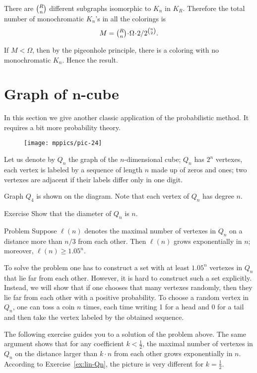 There are $\tbinom Rn$ different subgraphs isomorphic to $K_n$ in $K_R$.
Therefore the total number of monochromatic $K_n$'s in all the colorings 
is 
\[M=\tbinom Rn\cdot\Omega\cdot  2/2^{\binom n2}.\]

If $M<\Omega$, then by the pigeonhole principle,
there is a coloring with no monochromatic $K_n$.
Hence the result.
\qeds

\section*{Graph of $\bm{n}$-cube}

In this section we give another classic application of the probabilistic method.
It requires a bit more probability theory. 

\begin{wrapfigure}{o}{25mm}
\vskip-0mm
\centering
\texttt{[image: mppics/pic-24]}
\vskip-0mm
\end{wrapfigure}

Let us denote by $Q_n$ the graph of the $n$-dimensional cube;
$Q_n$ has $2^n$ vertexes, each vertex is labeled by a sequence of length $n$ made up of zeros and ones;
two vertexes are adjacent if their labels differ only in one digit.

Graph $Q_4$ is shown on the diagram.
Note that each vertex of $Q_n$ has degree $n$.


\begin{thm}{Exercise}
Show that the diameter of $Q_n$ is $n$. 
\end{thm}


\begin{thm}{Problem}\label{prob:Qn}
Suppose $\ell(n)$ denotes the maximal number of vertexes in $Q_n$ on a distance more than $n/3$ from each other.
Then $\ell(n)$ grows exponentially in $n$;
moreover, $\ell(n)\ge 1.05^n$. 
\end{thm}

To solve the problem one has to construct a set with at least $1.05^n$ vertexes in $Q_n$ that lie far from each other.
However, it is hard to construct such a set explicitly.
Instead, we will show that if one chooses that many vertexes randomly, then they lie far from each other with a positive probability.
To choose a random vertex in $Q_n$, one can toss a coin $n$ times, each time writing 1 for a head and 0 for a tail and then take the vertex labeled by the obtained sequence.

The following exercise guides you to a solution of the problem above.
The same argument shows that for any coefficient $k<\tfrac12$, the maximal number of vertexes in $Q_n$ on the distance larger than $k\cdot n$ from each other grows exponentially in $n$.
According to Exercise~\ref{ex:lin-Qn}, the picture is very different for $k= \tfrac12$.

